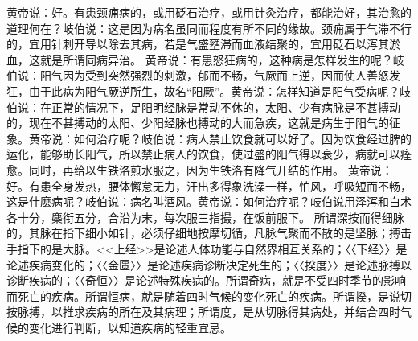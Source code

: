 \documentclass[a4paper,12pt,UTF8,twoside]{ctexbook}
\begin{document}
黄帝说：好。有患颈痈病的，或用砭石治疗，或用针灸治疗，都能治好，其治愈的道理何在？岐伯说：这是因为病名虽同而程度有所不同的缘故。颈痈属于气滞不行的，宜用针刺开导以除去其病，若是气盛壅滞而血液结聚的，宜用砭石以泻其淤血，这就是所谓同病异治。
黄帝说：有患怒狂病的，这种病是怎样发生的呢？岐伯说：阳气因为受到突然强烈的刺激，郁而不畅，气厥而上逆，因而使人善怒发狂，由于此病为阳气厥逆所生，故名“阳厥”。黄帝说：怎样知道是阳气受病呢？岐伯说：在正常的情况下，足阳明经脉是常动不休的，太阳、少有病脉是不甚搏动的，现在不甚搏动的太阳、少阳经脉也搏动的大而急疾，这就是病生于阳气的征象。黄帝说：如何治疗呢？岐伯说：病人禁止饮食就可以好了。因为饮食经过脾的运化，能够助长阳气，所以禁止病人的饮食，使过盛的阳气得以衰少，病就可以痊愈。同时，再给以生铁洛煎水服之，因为生铁洛有降气开结的作用。
黄帝说：好。有患全身发热，腰体懈怠无力，汗出多得象洗澡一样，怕风，呼吸短而不畅，这是什麽病呢？岐伯说：病名叫酒风。黄帝说：如何治疗呢？岐伯说用泽泻和白术各十分，麋衔五分，合沿为末，每次服三指撮，在饭前服下。
所谓深按而得细脉的，其脉在指下细小如针，必须仔细地按摩切循，凡脉气聚而不散的是坚脉；搏击手指下的是大脉。<<上经>>是论述人体功能与自然界相互关系的；〈〈下经〉〉是论述疾病变化的；〈〈金匮〉〉是论述疾病诊断决定死生的；〈〈揆度〉〉是论述脉搏以诊断疾病的；〈〈奇恒〉〉是论述特殊疾病的。所谓奇病，就是不受四时季节的影响而死亡的疾病。所谓恒病，就是随着四时气候的变化死亡的疾病。所谓揆，是说切按脉搏，以推求疾病的所在及其病理；所谓度，是从切脉得其病处，并结合四时气候的变化进行判断，以知道疾病的轻重宜忌。
\end{document}
